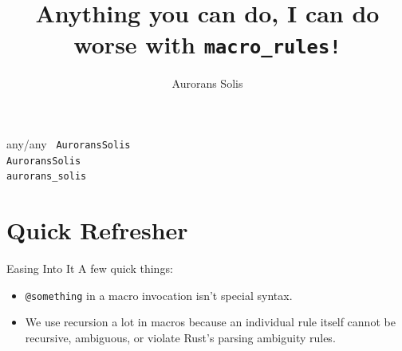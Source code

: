 \documentclass{beamer}
\title{Anything you can do, I can do worse with {\color{macrorulescolor}\texttt{macro\_rules!}}}
\author{Aurorans Solis}
\date{}
\begin{document}
	\begin{frame}
		\maketitle
		\vspace{-1.9cm}
		\scriptsize{any/any}
		\vspace{1.75cm}
		\newline
		\small{\texttt{
			{\color{black}\faGithub} AuroransSolis\\
			{\color{gitlabcolor}\faGitlab} AuroransSolis\\
			{\color{discordcolor}\faDiscord} aurorans\_solis
		}}
		\vspace{4cm}
	\end{frame}

	\section{Quick Refresher}
	\begin{frame}{Easing Into It}
		A few quick things:
		\pause
		\begin{itemize}
			\item \texttt{@something} in a macro invocation isn't special syntax.

			\pause

			\item We use recursion a lot in macros because an individual rule itself cannot be
			recursive, ambiguous, or violate Rust's parsing ambiguity rules.
		\end{itemize}
	\end{frame}
\end{document}
